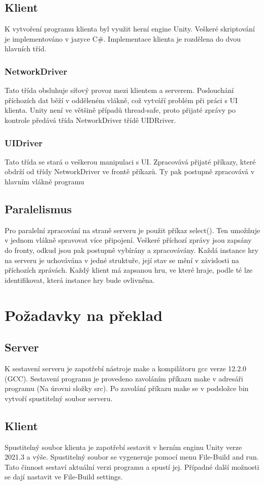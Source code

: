 \documentclass[12pt]{article}
\begin{document}
\subsection{Klient}
K vytvoření programu klienta byl využit herní engine Unity. Veškeré skriptování je implementováno v jazyce C\#. Implementace klienta je rozdělena do dvou hlavních tříd.
\subsubsection{NetworkDriver}
Tato třída obsluhuje síťový provoz mezi klientem a serverem. Poslouchání příchozích dat běží v odděleném vlákně, což vytváří problém při práci s UI klienta. Unity není ve většině případů thread-safe, proto přijaté zprávy po kontrole předává třída NetworkDriver třídě UIDRriver.
\subsubsection{UIDriver}
Tato třída se stará o veškerou manipulaci s UI. Zpracovává přijaté příkazy, které obdrží od třídy NetworkDriver ve frontě příkazů. Ty pak postupně zpracovává v hlavním vlákně programu

\subsection{Paralelismus}
Pro paralelní zpracování na straně serveru je použit příkaz select(). Ten umožňuje v jednom vlákně spravovat více připojení. Veškeré příchozí zprávy jsou zapsány do fronty, odkud jsou pak postupně vybírány a zpracovávány. Každá instance hry na serveru je uchovávána v jedné struktuře, její stav se mění v závislosti na příchozích zprávách. Každý klient má zapsanou hru, ve které hraje, podle té lze identifikovat, která instance hry bude ovlivněna. 

\newpage
\section{Požadavky na překlad}
\subsection{Server}
K sestavení serveru je zapotřebí nástroje make a kompilátoru gcc verze 12.2.0 (GCC). Sestavení programu je provedeno zavoláním příkazu make v adresáři programu (Na úrovni složky src). Po zavolání příkazu make se v podsložce bin vytvoří spustitelný soubor serveru.

\subsection{Klient}
Spustitelný soubor klienta je zapotřebí sestavit v herním enginu Unity verze 2021.3 a výše. Spustitelný soubor se vygeneruje pomocí menu File-Build and run. Tato činnost sestaví aktuální verzi programu a spustí jej. Případné další možnosti se dají nastavit ve File-Build settings.
\end{document}
